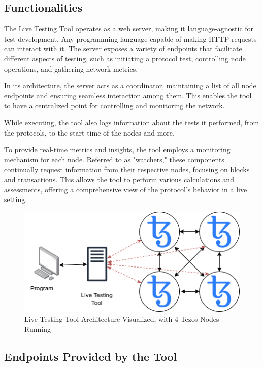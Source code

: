 \subsection*{\textbf{Functionalities}}
The Live Testing Tool operates as a web server, making it language-agnostic for test development. Any programming language capable of making HTTP requests can interact with it. The server exposes a variety of endpoints that facilitate different aspects of testing, such as initiating a protocol test, controlling node operations, and gathering network metrics.

In its architecture, the server acts as a coordinator, maintaining a list of all node endpoints and ensuring seamless interaction among them. This enables the tool to have a centralized point for controlling and monitoring the network.

While executing, the tool also logs information about the tests it performed, from the protocols, to the start time of the nodes and more.

To provide real-time metrics and insights, the tool employs a monitoring mechanism for each node. Referred to as "watchers," these components continually request information from their respective nodes, focusing on blocks and transactions. This allows the tool to perform various calculations and assessments, offering a comprehensive view of the protocol's behavior in a live setting.


\begin{figure}[H]
    \centering
    \includegraphics[width=\textwidth,keepaspectratio]{imagens/live_testing_tool.png}
    \caption{Live Testing Tool Architecture Visualized, with 4 Tezos Nodes Running}
    \label{fig:theorems}

\end{figure}



\subsection*{\textbf{Endpoints Provided by the Tool}}

